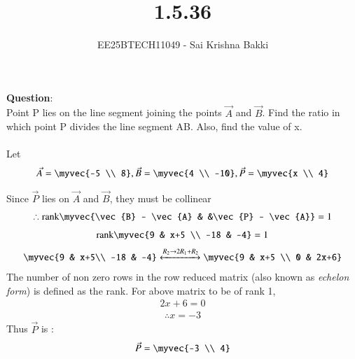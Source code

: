 \documentclass[journal]{IEEEtran}
\begin{document}

\vspace{3cm}

\title{1.5.36}
\author{EE25BTECH11049 - Sai Krishna Bakki}
 \maketitle
{\let\newpage\relax\maketitle}

\renewcommand{\thefigure}{\theenumi}
\renewcommand{\thetable}{\theenumi}
\setlength{\intextsep}{10pt} %


\renewcommand{\thetable}{\theenumi}

\textbf{Question}:\\
Point P lies on the line segment joining the points $\vec{A}$ and $\vec{B}$. Find the ratio in which point P divides the line segment AB. Also, find the value of x. \\ 
\solution \\
Let 
\begin{align}
\vec{A}= \myvec{-5 \\ 8}, \vec{B}= \myvec{4 \\ -10} , \vec{P} = \myvec{x \\ 4}
\end{align}    

Since $\vec{P}$ lies on $\vec{A}$ and $\vec{B}$, they must be collinear
\begin{align}
\therefore \text{rank}\myvec{\vec{B} - \vec{A} & &\vec{P} - \vec{A}} = 1
\end{align}
\begin{align}
    \text{rank}\myvec{9 & x+5 \\ -18 & -4} = 1
\end{align}
\begin{align}
	\myvec{9 &  x+5\\ -18 & -4} \xleftrightarrow[]{R_2 \rightarrow {2R_1 + R_2}} \myvec{9 & x+5 \\ 0 & 2x+6}  
\end{align}
The number of non zero rows in the row reduced matrix (also known as {\em echelon form}) is defined as the rank. For above matrix to be of rank 1,
\begin{align}
    2x+6 = 0
\end{align}
\begin{align}
\therefore x = -3
\end{align}
Thus $\vec{P}$ is :	
\begin{align}
    \vec{P} = \myvec{-3 \\ 4}
\end{align}
\end{document}
